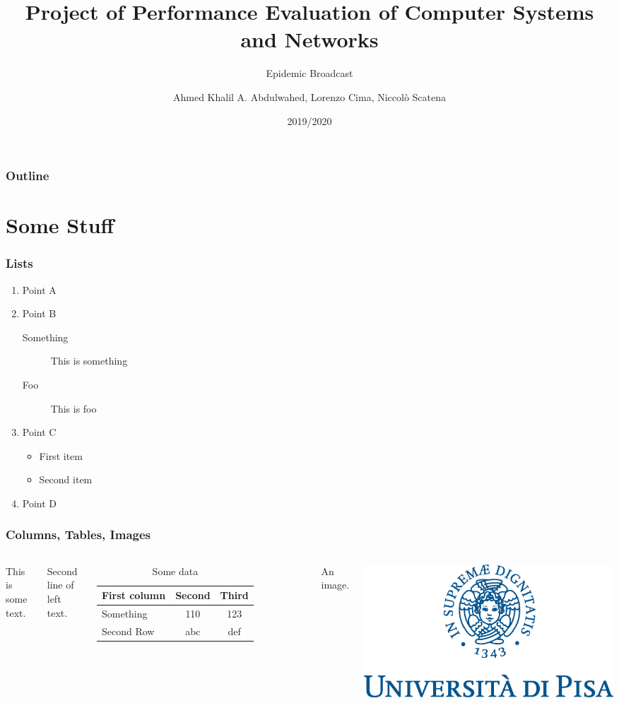 \documentclass{beamer}
\title{Project of Performance Evaluation of Computer Systems and Networks}
\subtitle{Epidemic Broadcast}
\author{Ahmed Khalil A. Abdulwahed, Lorenzo Cima, Niccolò Scatena}
\institute{University of Pisa}
\date{2019/2020}
\begin{document}
\begin{frame}
	\titlepage{}
\end{frame}

\begin{frame}
	\frametitle{Outline}
	\tableofcontents
\end{frame}

\section{Some Stuff}

\begin{frame}
	\frametitle{Lists}
	\begin{enumerate}
		\item Point A
		\item Point B
		\begin{description}
			\item[Something] This is something
			\item[Foo] This is foo
		\end{description}
		\item Point C
		\begin{itemize}
			\item First item
			\item Second item
		\end{itemize}
		\item Point D
	\end{enumerate}
\end{frame}

\begin{frame}
	\frametitle{Columns, Tables, Images}
	\begin{columns}
		This is some text.

		Second line of left text.

		\begin{table}
			\begin{tabular}{l | c | c}
				First column & Second & Third \\
				\hline \hline
				Something & 110 & 123 \\
				Second Row & abc & def
			\end{tabular}
			\caption{Some data}
		\end{table}
		An image.

		\includegraphics[scale=0.2]{img/marchio_unipi_pant541}
	\end{columns}
\end{frame}
\end{document}
